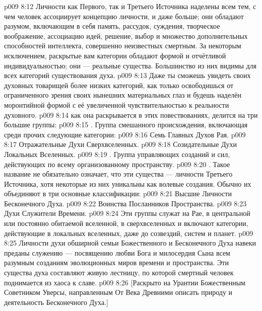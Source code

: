 \vs p009 8:12 Личности как Первого, так и Третьего Источника наделены всем тем, с чем человек ассоциирует концепцию личности, и даже больше; они обладают разумом, включающим в себя память, рассудок, суждения, творческое воображение, ассоциацию идей, решение, выбор и множество дополнительных способностей интеллекта, совершенно неизвестных смертным. За некоторым исключением, раскрытые вам категории обладают формой и отчётливой индивидуальностью; они --- реальные существа. Большинство из них видимы для всех категорий существования духа.
\vs p009 8:13 Даже ты сможешь увидеть своих духовных товарищей более низких категорий, как только освободишься от ограниченного зрения своих нынешних материальных глаз и будешь наделён моронтийной формой с её увеличенной чувствительностью к реальности духовного.
\vs p009 8:14 \pc {} как она раскрывается в этих повествованиях, делится на три большие группы:
\vs p009 8:15 . Группа смешанного происхождения, включающая среди прочих следующие категории:
\vs p009 8:16 Семь Главных Духов Рая.
\vs p009 8:17 Отражательные Духи Сверхвселенных.
\vs p009 8:18 Созидательные Духи Локальных Вселенных.
\vs p009 8:19 . Группа управляющих созданий и сил, действующих по всему организованному пространству.
\vs p009 8:20 . Такое название не обязательно означает, что эти существа --- личности Третьего Источника, хотя некоторые из них уникальны как волевые создания. Обычно их объединяют в три основные классификации:
\vs p009 8:21 Высшие Личности Бесконечного Духа.
\vs p009 8:22 Воинства Посланников Пространства.
\vs p009 8:23 Духи Служители Времени.
\vs p009 8:24 Эти группы служат на Рае, в центральной или постоянно обитаемой вселенной, в сверхвселенных и включают категории, действующие в локальных вселенных, даже до созвездий, систем и планет.
\vs p009 8:25 Личности духи обширной семьи Божественного и Бесконечного Духа навеки преданы служению --- посвящению любви Бога и милосердия Сына всем разумным созданиям эволюционных миров времени и пространства. Эти существа духа составляют живую лестницу, по которой смертный человек поднимается из хаоса к славе.
\vsetoff
\vs p009 8:26 [Раскрыто на Урантии Божественным Советником Уверсы, направленным От Века Древними описать природу и деятельность Бесконечного Духа.]
\quizlink
